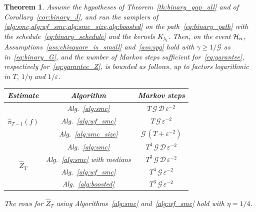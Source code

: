 \documentclass[aos]{imsart}%
\newcommand{\newres}{\cellcolor{blue!15}}
\theoremstyle{plain}
\newtheorem{theorem}{Theorem}[section]
\theoremstyle{definition}
\begin{document}
    \begin{theorem}
        \label{th:binary_main}
        Assume the hypotheses of Theorem~\ref{th:binary_gap_all} and of
        Corollary~\ref{cor:binary_J}, and run the samplers of
        \cref{alg:smc,alg:wf_smc,alg:smc_size,alg:boosted} on the
        path~\eqref{eq:binary_path} with the schedule~\eqref{eq:binary_schedule}
        and the kernels $K_{\lambda_t}$. Then, on the event $\mathcal{H}_n$,
        Assumptions~\ref{ass:chisquare_is_small} and~\ref{ass:spg} hold with
        $\gamma\geq1/\mathcal{G}$ as in~\eqref{eq:binary_G}, and the number of
        Markov steps sufficient for~\eqref{eq:garantee}, respectively
        for~\eqref{eq:garantee_Z}, is bounded as follows, up to factors
        logarithmic in $T$, $1/\eta$ and $1/\varepsilon$.
        \begin{center}
            \begin{tabular}{c|c|c}
                \arrayrulecolor{black}
                \textbf{Estimate} & \textbf{Algorithm} & \textbf{Markov steps} \\
                \hline
                \multirow{3}{*}{$\widehat\pi_{T-1}(f)$}
                & Alg.~\ref{alg:smc}
                & $T\,\mathcal{G}\,\mathcal{D}\,\varepsilon^{-2}$ \\
                \hhline{~--}
                & Alg.~\ref{alg:wf_smc}
                & \newres $T\,\mathcal{G}\,\varepsilon^{-2}$ \\
                \hhline{~--}
                & Alg.~\ref{alg:smc_size}
                & \newres $\mathcal{G}\,(T+\varepsilon^{-2})$ \\
                \hline
                \multirow{4}{*}{$\widehat Z_T$}
                & Alg.~\ref{alg:smc}
                & \newres $T^4\,\mathcal{G}\,\mathcal{D}\,\varepsilon^{-2}$ \\
                \hhline{~--}
                & Alg.~\ref{alg:smc} with medians
                & \newres $T^3\,\mathcal{G}\,\mathcal{D}\,\varepsilon^{-2}$ \\
                \hhline{~--}
                & Alg.~\ref{alg:wf_smc}
                & \newres $T^4\,\mathcal{G}\,\varepsilon^{-2}$ \\
                \hhline{~--}
                & Alg.~\ref{alg:boosted}
                & \newres $T^3\,\mathcal{G}\,\varepsilon^{-2}$ \\
                \hline
            \end{tabular}
        \end{center}
        The rows for $\widehat Z_T$ using Algorithms~\ref{alg:smc}
        and~\ref{alg:wf_smc} hold with $\eta=1/4$.
    \end{theorem}
\end{document}
